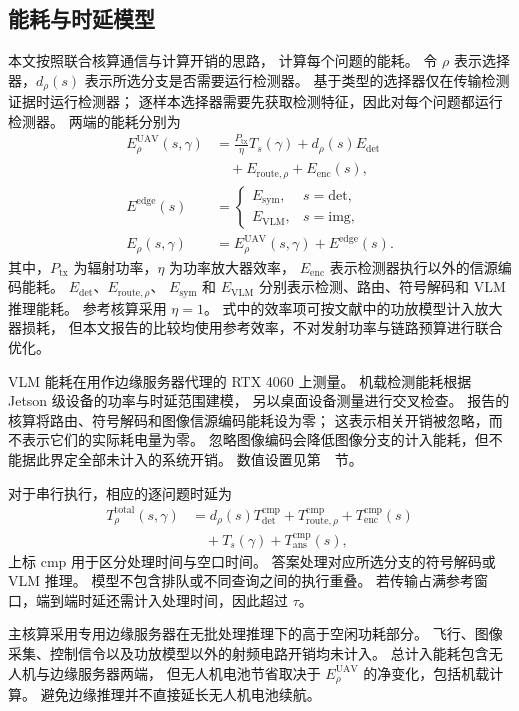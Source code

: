 \subsection{能耗与时延模型}\label{subsec:energyacct}
本文按照联合核算通信与计算开销的思路\cite{dai2025pscom}，
计算每个问题的能耗。
令 $\rho$ 表示选择器，$d_\rho(s)$ 表示所选分支是否需要运行检测器。
基于类型的选择器仅在传输检测证据时运行检测器；
逐样本选择器需要先获取检测特征，因此对每个问题都运行检测器。
两端的能耗分别为
\begin{equation}\label{eq:energy}
\begin{aligned}
E_\rho^{\mathrm{UAV}}(s,\gamma)
 &=\frac{P_{\mathrm{tx}}}{\eta}T_s(\gamma)
   +d_\rho(s)E_{\mathrm{det}}\\
 &\quad+E_{\mathrm{route},\rho}+E_{\mathrm{enc}}(s),\\
E^{\mathrm{edge}}(s)
 &=\begin{cases}
 E_{\mathrm{sym}}, & s=\mathrm{det},\\
 E_{\mathrm{VLM}}, & s=\mathrm{img},
 \end{cases}\\
E_\rho(s,\gamma)
 &=E_\rho^{\mathrm{UAV}}(s,\gamma)+E^{\mathrm{edge}}(s).
\end{aligned}
\end{equation}
其中，$P_{\mathrm{tx}}$ 为辐射功率，$\eta$ 为功率放大器效率，
$E_{\mathrm{enc}}$ 表示检测器执行以外的信源编码能耗。
$E_{\mathrm{det}}$、$E_{\mathrm{route},\rho}$、
$E_{\mathrm{sym}}$ 和 $E_{\mathrm{VLM}}$
分别表示检测、路由、符号解码和 VLM 推理能耗。
参考核算采用 $\eta=1$。
式中的效率项可按文献中的功放模型计入放大器损耗\cite{cui2005energy}，
但本文报告的比较均使用参考效率，不对发射功率与链路预算进行联合优化。

VLM 能耗在用作边缘服务器代理的 RTX 4060 上测量。
机载检测能耗根据 Jetson 级设备的功率与时延范围建模，
另以桌面设备测量进行交叉检查。
报告的核算将路由、符号解码和图像信源编码能耗设为零；
这表示相关开销被忽略，而不表示它们的实际耗电量为零。
忽略图像编码会降低图像分支的计入能耗，但不能据此界定全部未计入的系统开销。
数值设置见第~~节。

对于串行执行，相应的逐问题时延为
\begin{equation}
\begin{aligned}
T_\rho^{\mathrm{total}}(s,\gamma)
 &=d_\rho(s)T_{\mathrm{det}}^{\mathrm{cmp}}
   +T_{\mathrm{route},\rho}^{\mathrm{cmp}}
   +T_{\mathrm{enc}}^{\mathrm{cmp}}(s)\\
 &\quad+T_s(\gamma)+T_{\mathrm{ans}}^{\mathrm{cmp}}(s),
\end{aligned}
\end{equation}
上标 $\mathrm{cmp}$ 用于区分处理时间与空口时间。
答案处理对应所选分支的符号解码或 VLM 推理。
模型不包含排队或不同查询之间的执行重叠。
若传输占满参考窗口，端到端时延还需计入处理时间，因此超过 $\tau$。

主核算采用专用边缘服务器在无批处理推理下的高于空闲功耗部分。
飞行、图像采集、控制信令以及功放模型以外的射频电路开销均未计入。
总计入能耗包含无人机与边缘服务器两端，
但无人机电池节省取决于 $E_\rho^{\mathrm{UAV}}$ 的净变化，包括机载计算。
避免边缘推理并不直接延长无人机电池续航。
